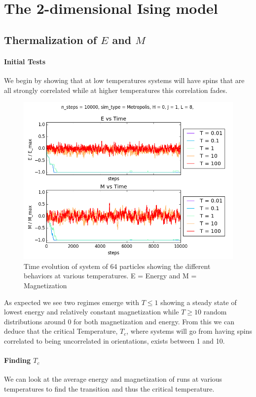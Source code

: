 \documentclass[a4paper,11pt]{article}
\begin{document}
\section{The 2-dimensional Ising model}

    \subsection{Thermalization of $E$ and $M$}

        \paragraph{Initial Tests}We begin by showing that at low temperatures systems will have spins that are all strongly correlated while at higher temperatures this correlation fades.

        \begin{figure}[H]
            \centering
            \includegraphics[width=.75\textwidth]{Graphs/Large_Temp_slice.png}
            \caption{Time evolution of system of 64 particles showing the different behaviors at various temperatures. E = Energy and M = Magnetization} 
        \end{figure}

        As expected we see two regimes emerge with $T \le 1$ showing a steady state of lowest energy and relatively constant magnetization while $T \ge 10$ random distributions around 0 for both magnetization and energy. From this we can deduce that the critical Temperature, $T_c$, where systems will go from having spins correlated to being uncorrelated in orientations, exists between 1 and 10. 


        \paragraph{Finding $T_c$} We can look at the average energy and magnetization of runs at various temperatures to find the transition and thus the critical temperature.
        
\end{document}
